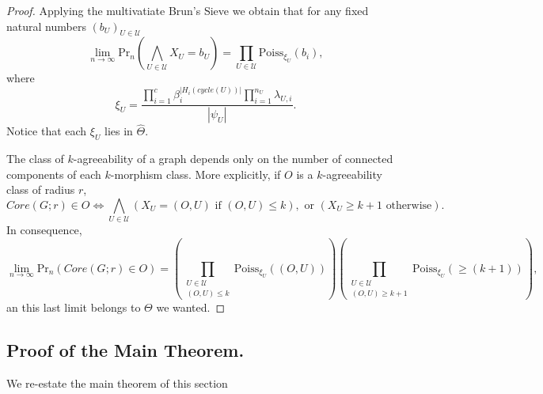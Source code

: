 \documentclass[11pt,notitlepage,a4paper]{article}
\theoremstyle{definition}
\newcommand{\Ln}{\lim\limits_{n\to \infty}}
\begin{document}
\begin{proof}
	Applying the multivatiate Brun's Sieve we obtain that for any fixed  
	natural numbers $(b_U)_{U\in \mathcal{U}}$ 
	\[\Ln \mathrm{Pr}_n\left( \bigwedge_{U\in \mathcal{U}} X_U=b_U  \right)=
	\prod_{U\in \mathcal{U}}\mathrm{Poiss}_{\xi_U}(b_i),
	\]
	where
	\[ \xi_U= \frac{ \prod_{i=1}^c \beta_i^{|H_i(cycle(U))|} \prod_{i=1}^{n_U} \lambda_{U,i}}{|\psi_U|}.\]
	Notice that each $\xi_U$ lies in $\widehat{\Theta}$.
	
	The class of $k$-agreeability of a graph depends only on the number
	of connected components of each $k$-morphism class. More explicitly, 
	if $O$ is a $k$-agreeability class of radius $r$, 
	\[Core(G;r)\in O \iff \bigwedge_{U\in \mathcal{U}} (X_U=(O,U) \text{ if }(O,U)\leq k), \text{ or }  (X_U\geq k+1 \text{ otherwise}).\]
	In consequence,
	\[ \Ln \mathrm{Pr}_n(Core(G;r)\in O) = \left(\prod_{\substack{U\in \mathcal{U}\\(O,U)\leq k}} \mathrm{Poiss}_{\xi_U}((O,U)) \right) \left(\prod_{\substack{U\in \mathcal{U}\\(O,U)\geq k+1}}
	\mathrm{Poiss}_{\xi_U}(\geq (k+1)) \right),\]
	an this last limit belongs to $\Theta$ we wanted.   
\end{proof}

\subsection{Proof of the Main Theorem.}
 
We re-estate the main theorem of this section 
\end{document}
